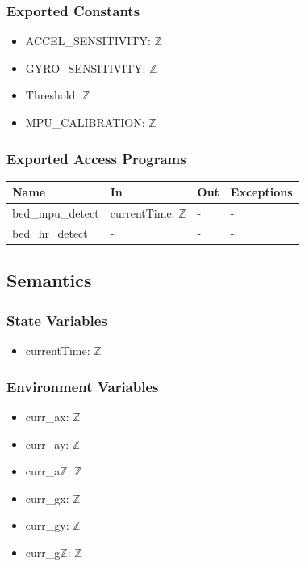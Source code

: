 \documentclass[12pt, titlepage]{article}
\begin{document}
\subsubsection{Exported Constants}

\begin{itemize}
\item ACCEL\_SENSITIVITY: $\mathbb{Z}$
\item GYRO\_SENSITIVITY: $\mathbb{Z}$
\item Threshold: $\mathbb{Z}$
\item MPU\_CALIBRATION: $\mathbb{Z}$
\end{itemize}

\subsubsection{Exported Access Programs}
\begin{center}
\begin{tabular}{p{4cm} p{4cm} p{3.5cm} p{3.6cm}}
\hline
\textbf{Name} & \textbf{In} & \textbf{Out} & \textbf{Exceptions} \\
\hline
bed\_mpu\_detect & currentTime: $\mathbb{Z}$ & - & - \\
bed\_hr\_detect & - & - & - \\
\hline
\end{tabular}
\end{center}

\subsection{Semantics}

\subsubsection{State Variables}
\begin{itemize}
\item currentTime: $\mathbb{Z}$
\end{itemize}

\subsubsection{Environment Variables}
\begin{itemize}
\item curr\_ax: $\mathbb{Z}$
\item curr\_ay: $\mathbb{Z}$
\item curr\_a$\mathbb{Z}$: $\mathbb{Z}$
\item curr\_gx: $\mathbb{Z}$
\item curr\_gy: $\mathbb{Z}$
\item curr\_g$\mathbb{Z}$: $\mathbb{Z}$
\end{itemize}
\end{document}

